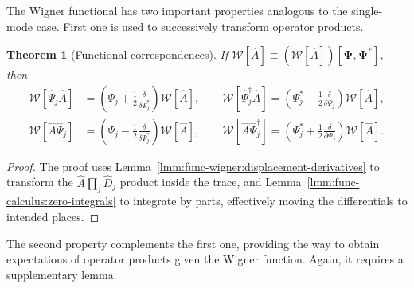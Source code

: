 \documentclass[12pt,aip,jmp,amssymb,amsmath]{revtex4-1}
\newtheorem{theorem}{Theorem}
\begin{document}
The Wigner functional has two important properties analogous to the single-mode case.
First one is used to successively transform operator products.

\begin{theorem}[Functional correspondences]
\label{thm:func-wigner:correspondences}
    If $\mathcal{W} [ \hat{A} ] \equiv (\mathcal{W} [ \hat{A} ]) [\boldsymbol{\Psi}, \boldsymbol{\Psi}^*]$, then
    \begin{equation*}\begin{split}
        \mathcal{W} [ \hat{\Psi}_j \hat{A} ]
            & = \left( \Psi_j + \frac{1}{2} \frac{\delta}{\delta \Psi_j^*} \right) \mathcal{W}[\hat{A}],
        \qquad
        \mathcal{W} [ \hat{\Psi}_j^\dagger \hat{A} ]
            = \left( \Psi_j^* - \frac{1}{2} \frac{\delta}{\delta \Psi_j} \right) \mathcal{W}[\hat{A}], \\
        \mathcal{W} [ \hat{A} \hat{\Psi}_j ]
            & = \left( \Psi_j - \frac{1}{2} \frac{\delta}{\delta \Psi_j^*} \right) \mathcal{W}[\hat{A}],
        \qquad
        \mathcal{W} [ \hat{A} \hat{\Psi}_j^\dagger ]
            = \left( \Psi_j^* + \frac{1}{2} \frac{\delta}{\partial \Psi_j} \right) \mathcal{W}[\hat{A}].
    \end{split}\end{equation*}
\end{theorem}
\begin{proof}
The proof uses Lemma~\ref{lmm:func-wigner:displacement-derivatives} to transform the $\hat{A} \prod_j \hat{D}_j$ product inside the trace, and Lemma~\ref{lmm:func-calculus:zero-integrals} to integrate by parts, effectively moving the differentials to intended places.
\end{proof}

The second property complements the first one, providing the way to obtain expectations of operator products given the Wigner function.
Again, it requires a supplementary lemma.
\end{document}
